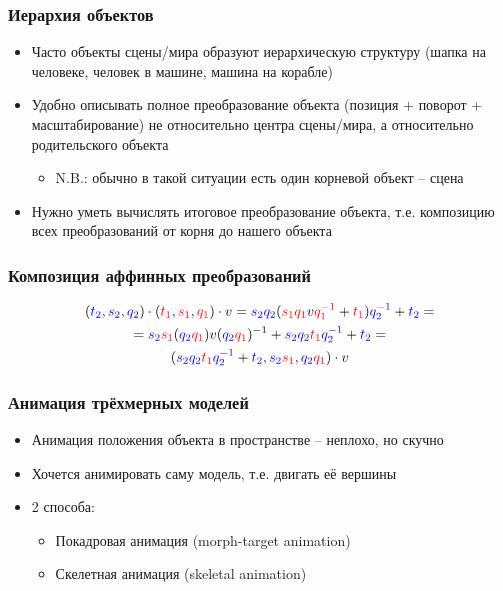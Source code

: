 \documentclass{beamer}
\begin{document}
\begin{frame}[fragile]
\frametitle{Иерархия объектов}
\begin{itemize}
\item Часто объекты сцены/мира образуют иерархическую структуру (шапка на человеке, человек в машине, машина на корабле)
\pause
\item Удобно описывать полное преобразование объекта (позиция + поворот + масштабирование) не относительно центра сцены/мира, а относительно родительского объекта
\begin{itemize}
\item N.B.: обычно в такой ситуации есть один корневой объект -- сцена
\end{itemize}
\pause
\item Нужно уметь вычислять итоговое преобразование объекта, т.е. композицию всех преобразований от корня до нашего объекта
\end{itemize}
\end{frame}

\begin{frame}[fragile]
\frametitle{Композиция аффинных преобразований}
\begin{multline}
({\color{blue}t_2},{\color{blue}s_2},{\color{blue}q_2}) \cdot ({\color{red}t_1},{\color{red}s_1},{\color{red}q_1}) \cdot v = {\color{blue}s_2}{\color{blue}q_2}({\color{red}s_1}{\color{red}q_1}v{\color{red}q_1^{-1}} + {\color{red}t_1}){\color{blue}q_2^{-1}} + {\color{blue}t_2} = \\
= {\color{blue}s_2}{\color{red}s_1} ({\color{blue}q_2}{\color{red}q_1}) v ({\color{blue}q_2}{\color{red}q_1})^{-1} + {\color{blue}s_2}{\color{blue}q_2}{\color{red}t_1}{\color{blue}q_2^{-1}} + {\color{blue}t_2} = \\
({\color{blue}s_2}{\color{blue}q_2}{\color{red}t_1}{\color{blue}q_2^{-1}} + {\color{blue}t_2}, {\color{blue}s_2}{\color{red}s_1}, {\color{blue}q_2}{\color{red}q_1}) \cdot v
\end{multline}
\end{frame}

\begin{frame}[fragile]
\frametitle{Анимация трёхмерных моделей}
\begin{itemize}
\item Анимация положения объекта в пространстве -- неплохо, но скучно
\item Хочется анимировать саму модель, т.е. двигать её вершины
\pause
\item 2 способа:
\begin{itemize}
\item Покадровая анимация (morph-target animation)
\item Скелетная анимация (skeletal animation)
\end{itemize}
\end{itemize}
\end{frame}
\end{document}
